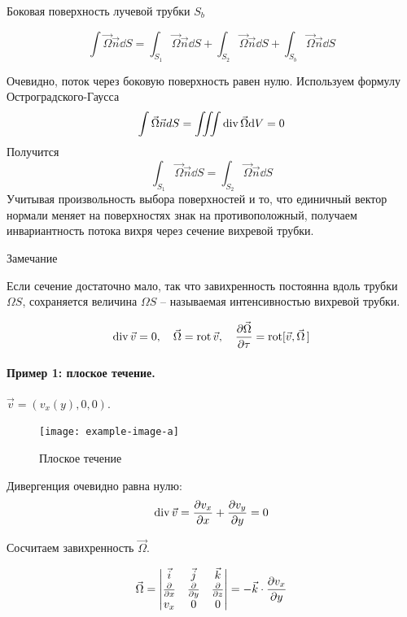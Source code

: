 Боковая поверхность лучевой трубки $S_b$

\begin{equation}
 	\int \vec \Omega \vec{n} \dd S=\int_{S_1} \vec \Omega \vec{n} \dd S  + \int_{S_2} \vec \Omega \vec{n} \dd S + \int_{S_b} \vec \Omega \vec{n} \dd S
 \end{equation} 

Очевидно, поток через боковую поверхность равен нулю. Используем формулу Остроградского-Гаусса
\begin{equation}
	\int \vec \Omega \vec{n} dS=\iiint \operatorname{div}\vec \Omega \dd V=0
\end{equation}
Получится
\begin{equation}
	\int_{S_1} \vec \Omega \vec{n} \dd S=\int_{S_2} \vec \Omega \vec{n} \dd S
\end{equation}
Учитывая произвольность выбора поверхностей и то, что единичный
вектор нормали меняет на поверхностях знак на противоположный,
получаем инвариантность потока вихря через сечение вихревой трубки.

Замечание

Если сечение достаточно мало, так что завихренность постоянна вдоль
трубки $\Omega S$, сохраняется величина $\Omega S$ -- называемая интенсивностью
вихревой трубки.

\begin{equation}
	\operatorname{div} \vec{v}=0, \quad
	\vec \Omega=\operatorname{rot}\vec{v}, \quad
	\pdv{\vec \Omega}{\tau}=\operatorname{rot}[\vec{v},\vec{\Omega}\,]
\end{equation}

\paragraph{Пример 1: плоское течение.} $\vec{v}=(v_x(y),0,0)$.
\begin{figure}[h!]
    \centering
    \texttt{[image: example-image-a]}
    \caption{Плоское течение}
    \label{fig:figure1}
\end{figure}
 Дивергенция очевидно равна нулю:
\begin{equation}
	\operatorname{div}\vec{v}=\pdv{v_x}{x}+\pdv{v_y}{y}=0
\end{equation}

Сосчитаем завихренность $\vec\Omega$.

\begin{equation}
	\vec{\Omega}=\mqty| %
		\vec{i}&\vec{j}&\vec{k}\\
		\pdv{x}&\pdv{y}&\pdv{z}\\
		v_x&0&0
	|=-\vec{k}\cdot\pdv{v_x}{y}
\end{equation}

